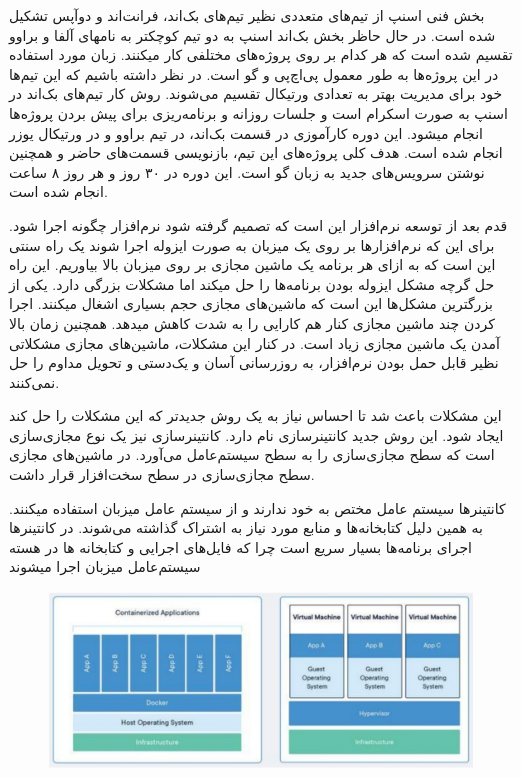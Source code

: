 \documentclass[a4]{report}
\begin{document}
بخش فنی اسنپ از تیم‌های متعددی نظیر تیم‌های بک‌اند، فرانت‌اند و دوآپس
تشکیل شده است. در حال حاظر بخش بک‌اند اسنپ به دو تیم کوچکتر به نامهای آلفا و براوو تقسیم شده است که هر کدام بر روی پروژه‌های مختلفی کار میکنند. زبان مورد استفاده در این پروژه‌ها به طور معمول پی‌اچ‌پی و گو است.
در نظر داشته باشیم که این تیم‌ها خود برای مدیریت بهتر به تعدادی ورتیکال تقسیم می‌شوند.
روش کار تیم‌های بک‌اند در اسنپ به صورت اسکرام است و جلسات روزانه و برنامه‌ریزی برای پیش بردن پروژه‌ها انجام میشود.
این دوره کارآموزی در قسمت بک‌اند، در تیم براوو و در ورتیکال یوزر انجام شده است. هدف کلی پروژه‌های این تیم، بازنویسی
قسمت‌های حاضر و همچنین نوشتن سرویس‌های جدید به زبان گو است. این دوره در ۳۰ روز و هر روز ۸ ساعت انجام شده است.


قدم بعد از توسعه نرم‌افزار این است که تصمیم گرفته شود نرم‌افزار چگونه اجرا شود. برای این که نرم‌افزارها بر روی یک میزبان به صورت ایزوله اجرا شوند یک راه سنتی این است که به ازای هر برنامه یک ماشین مجازی
بر روی میزبان بالا بیاوریم. این راه حل گرچه مشکل ایزوله بودن برنامه‌ها را حل میکند اما مشکلات بزرگی دارد.
یکی از بزرگترین مشکل‌ها این است که ماشین‌های مجازی حجم بسیاری اشغال میکنند. اجرا کردن چند ماشین
مجازی کنار هم کارایی را به شدت کاهش میدهد. همچنین زمان بالا آمدن یک ماشین مجازی زیاد است. در کنار این مشکلات، ماشین‌های مجازی مشکلاتی نظیر قابل حمل بودن نرم‌افزار، به روز‌رسانی آسان و یک‌دستی و تحویل مداوم را حل نمی‌کنند.

این مشکلات باعث شد تا احساس نیاز به یک روش جدیدتر که این مشکلات را حل کند ایجاد شود. این روش جدید کانتینرسازی نام دارد. کانتینرسازی نیز یک نوع مجازی‌سازی است که سطح مجازی‌سازی را به سطح سیستم‌عامل می‌آورد. در ماشین‌های مجازی سطح مجازی‌سازی در سطح سخت‌افزار قرار داشت.

کانتینرها سیستم عامل مختص به خود ندارند و از سیستم عامل میزبان استفاده میکنند. به همین دلیل
کتابخانه‌ها و منابع مورد نیاز به اشتراک گذاشته می‌شوند. در کانتینرها اجرای برنامه‌ها بسیار سریع است چرا که
فایل‌های اجرایی و کتابخانه ها در هسته سیستم‌عامل میزبان اجرا میشوند

\begin{figure}
\centering
\includegraphics[scale=0.25]{fig/vm}
\end{figure}
\end{document}
